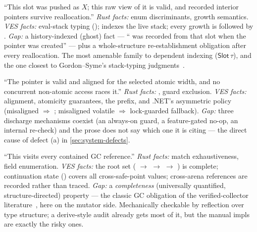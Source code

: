 \begin{obligationbox}
``This slot was pushed as $X$; this raw view of it is valid, and
recorded interior pointers survive  reallocation.''
\emph{Rust facts:} enum discriminants,  growth semantics.
\emph{VES facts:} eval-stack typing ();
 indexes the live stack;
every growth is followed by .
\emph{Gap:} a history-indexed (ghost) fact --- `` was recorded
from that slot when the pointer was created'' --- plus a
whole-structure re-establishment obligation after every reallocation.
The most amenable family to dependent indexing
($\mathsf{Slot}\,\tau$), and the one closest to Gordon--Syme's
stack-typing judgments~\cite{gordonsyme2001}.
\end{obligationbox}

\begin{obligationbox}
``The pointer is valid and aligned for the selected atomic width, and no
concurrent non-atomic access races it.'' \emph{Rust facts:}
, guard exclusion. \emph{VES facts:} 
alignment,  atomicity guarantees, the 
prefix, and .NET's asymmetric policy (misaligned 
$\Rightarrow$ ; misaligned volatile
$\Rightarrow$ lock-guarded fallback). \emph{Gap:} three discharge
mechanisms coexist (an always-on guard, a feature-gated no-op, an
internal re-check) and the prose does not say which one it is citing ---
the direct cause of defect (a) in \cref{sec:system-defects}.
\end{obligationbox}

\begin{obligationbox}
``This  visits every contained GC reference.'' \emph{Rust
facts:} match exhaustiveness, field enumeration. \emph{VES facts:} the
root set ( $\to$  $\to$
 $\to$ ) is complete; continuation
state () covers all cross-safe-point values;
cross-arena references are recorded rather than traced. \emph{Gap:} a
\emph{completeness} (universally quantified, structure-directed)
property --- the classic GC obligation of the verified-collector
literature~\cite{hawblitzelpetrank2009}, here on the mutator side.
Mechanically checkable by reflection over type structure; a derive-style
audit already gets most of it, but the manual impls are exactly the
risky ones.
\end{obligationbox}

